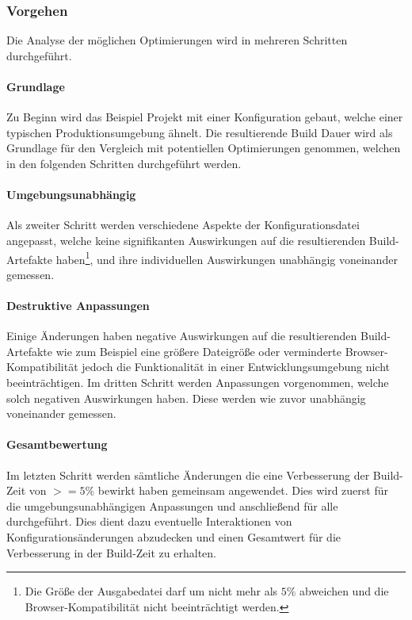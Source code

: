 \documentclass[11pt]{article}
\begin{document}
			\subsubsection{Vorgehen}
				Die Analyse der möglichen Optimierungen wird in mehreren Schritten durchgeführt.
				\paragraph{Grundlage} Zu Beginn wird das Beispiel Projekt mit einer Konfiguration gebaut, welche einer typischen Produktionsumgebung ähnelt. Die resultierende Build Dauer wird als Grundlage für den Vergleich mit potentiellen Optimierungen genommen, welchen in den folgenden Schritten durchgeführt werden.
				
				\paragraph{Umgebungsunabhängig} Als zweiter Schritt werden verschiedene Aspekte der Konfigurationsdatei angepasst, welche keine signifikanten Auswirkungen auf die resultierenden Build-Artefakte haben\footnote{Die Größe der Ausgabedatei darf um nicht mehr als $5\%$ abweichen und die Browser-Kompatibilität nicht beeinträchtigt werden.}, und ihre individuellen Auswirkungen unabhängig voneinander gemessen.
				
				\paragraph{Destruktive Anpassungen} Einige Änderungen haben negative Auswirkungen auf die resultierenden Build-Artefakte wie zum Beispiel eine größere Dateigröße oder verminderte Browser-Kompatibilität jedoch die Funktionalität in einer Entwicklungsumgebung nicht beeinträchtigen. Im dritten Schritt werden Anpassungen vorgenommen, welche solch negativen Auswirkungen haben. Diese werden wie zuvor unabhängig voneinander gemessen.
				
				\paragraph{Gesamtbewertung} Im letzten Schritt werden sämtliche Änderungen die eine Verbesserung der Build-Zeit von $>=5\%$ bewirkt haben gemeinsam angewendet. Dies wird zuerst für die umgebungsunabhängigen Anpassungen und anschließend für alle durchgeführt. Dies dient dazu eventuelle Interaktionen von Konfigurationsänderungen abzudecken und einen Gesamtwert für die Verbesserung in der Build-Zeit zu erhalten.
				 
\end{document}
